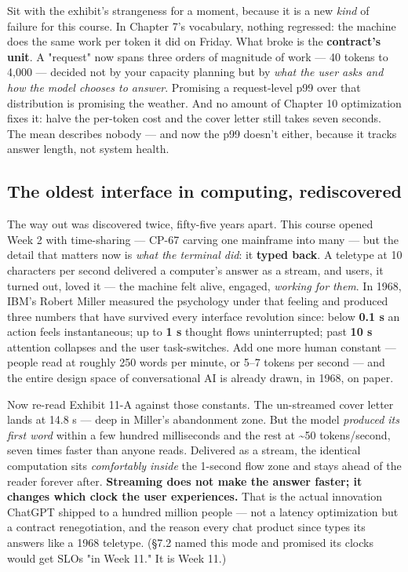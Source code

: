 Sit with the exhibit's strangeness for a moment, because it is a new \textit{kind} of failure for this course. In Chapter 7's vocabulary, nothing regressed: the machine does the same work per token it did on Friday. What broke is the \textbf{contract's unit}. A "request" now spans three orders of magnitude of work — 40 tokens to 4,000 — decided not by your capacity planning but by \textit{what the user asks and how the model chooses to answer}. Promising a request-level p99 over that distribution is promising the weather. And no amount of Chapter 10 optimization fixes it: halve the per-token cost and the cover letter still takes seven seconds. The mean describes nobody — and now the p99 doesn't either, because it tracks answer length, not system health.

\subsection*{The oldest interface in computing, rediscovered}

The way out was discovered twice, fifty-five years apart. This course opened Week 2 with time-sharing — CP-67 carving one mainframe into many — but the detail that matters now is \textit{what the terminal did}: it \textbf{typed back}. A teletype at 10 characters per second delivered a computer's answer as a stream, and users, it turned out, loved it — the machine felt alive, engaged, \textit{working for them}. In 1968, IBM's Robert Miller measured the psychology under that feeling and produced three numbers that have survived every interface revolution since: below \textbf{0.1 s} an action feels instantaneous; up to \textbf{1 s} thought flows uninterrupted; past \textbf{10 s} attention collapses and the user task-switches. Add one more human constant — people read at roughly 250 words per minute, or 5–7 tokens per second — and the entire design space of conversational AI is already drawn, in 1968, on paper.

Now re-read Exhibit 11-A against those constants. The un-streamed cover letter lands at 14.8 s — deep in Miller's abandonment zone. But the model \textit{produced its first word} within a few hundred milliseconds and the rest at \textasciitilde{}50 tokens/second, seven times faster than anyone reads. Delivered as a stream, the identical computation sits \textit{comfortably inside} the 1-second flow zone and stays ahead of the reader forever after. \textbf{Streaming does not make the answer faster; it changes which clock the user experiences.} That is the actual innovation ChatGPT shipped to a hundred million people — not a latency optimization but a contract renegotiation, and the reason every chat product since types its answers like a 1968 teletype. (§7.2 named this mode and promised its clocks would get SLOs "in Week 11." It is Week 11.)

